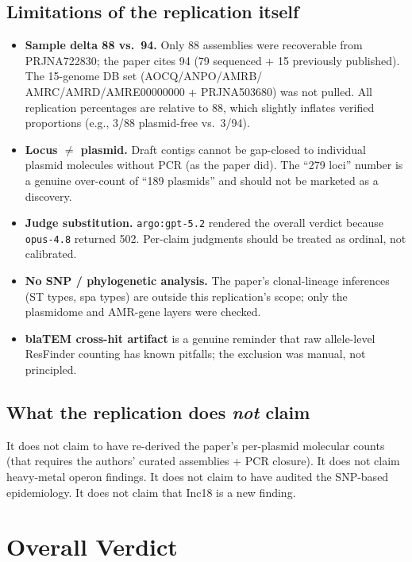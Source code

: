 \documentclass[11pt]{article}
\begin{document}
\subsection{Limitations of the replication itself}
\begin{itemize}[leftmargin=1.5em]
  \item \textbf{Sample delta 88 vs.\ 94.} Only 88 assemblies were
        recoverable from PRJNA722830; the paper cites 94 (79 sequenced +
        15 previously published). The 15-genome DB set (AOCQ/ANPO/AMRB/
        AMRC/AMRD/AMRE00000000 + PRJNA503680) was not pulled. All
        replication percentages are relative to 88, which slightly
        inflates verified proportions (e.g., 3/88 plasmid-free vs.\ 3/94).
  \item \textbf{Locus $\neq$ plasmid.} Draft contigs cannot be gap-closed
        to individual plasmid molecules without PCR (as the paper did).
        The ``279 loci'' number is a genuine over-count of ``189 plasmids''
        and should not be marketed as a discovery.
  \item \textbf{Judge substitution.} \texttt{argo:gpt-5.2} rendered the
        overall verdict because \texttt{opus-4.8} returned 502. Per-claim
        judgments should be treated as ordinal, not calibrated.
  \item \textbf{No SNP / phylogenetic analysis.} The paper's
        clonal-lineage inferences (ST types, spa types) are outside this
        replication's scope; only the plasmidome and AMR-gene layers were
        checked.
  \item \textbf{blaTEM cross-hit artifact} is a genuine reminder that
        raw allele-level ResFinder counting has known pitfalls; the
        exclusion was manual, not principled.
\end{itemize}

\subsection{What the replication does \emph{not} claim}
It does not claim to have re-derived the paper's per-plasmid molecular
counts (that requires the authors' curated assemblies + PCR closure). It
does not claim heavy-metal operon findings. It does not claim to have
audited the SNP-based epidemiology. It does not claim that Inc18 is a new
finding.

\section{Overall Verdict}
\end{document}
